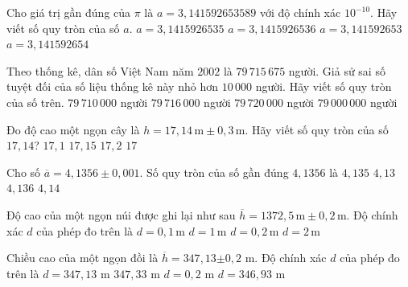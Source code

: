\begin{ex}%
	Cho giá trị gần đúng của $\pi $ là $ a=3,141592653589$ với độ chính xác $10^{-10}$. Hãy viết số quy tròn của số $a$.
	\choice
	{$ a=3{,}1415926535$}
	{$ a=3{,}1415926536$}
	{$ a=3{,}141592653$}
	{\True $ a=3{,}141592654$}
\end{ex}

\begin{ex}%
	Theo thống kê, dân số Việt Nam năm $ 2002$ là $ 79\, 715 \, 675$ người. Giả sử sai số tuyệt đối của số liệu thống kê này nhỏ hơn $ 10\, 000$ người. Hãy viết số quy tròn của số trên.
	\choice
	{$ 79\, 710\, 000$ người}
	{$ 79\, 716\, 000$ người}
	{\True $ 79\, 720\, 000$ người}
	{$ 79\, 000\, 000$ người}
\end{ex}

\begin{ex}%
	Đo độ cao một ngọn cây là $h=17{,}14\,\text{m}\pm 0{,}3\,\text{m}$. Hãy viết số quy tròn của số $17{,}14$?
	\choice
	{$17{,}1$}
	{$17{,}15$}
	{$17{,}2$}
	{\True $17$}
\end{ex}

\begin{ex}%
	Cho số $\overline{a}=4{,}1356\pm 0{,}001$. Số quy tròn của số gần đúng $ 4{,}1356$ là
	\choice
	{$ 4{,}135$}
	{$ 4{,}13$}
	{$ 4{,}136$}
	{\True $ 4{,}14$}
\end{ex}

\begin{ex}%
	Độ cao của một ngọn núi được ghi lại như sau $\overline{h}=1372{,}5\,\text{m}\pm 0{,}2\,\text{m}$. Độ chính xác $ d$ của phép đo trên là
	\choice
	{$ d=0{,}1\,\text{m}$}
	{$ d=1\,\text{m}$}
	{\True $ d=0{,}2\,\text{m}$}
	{$ d=2\,\text{m}$}
\end{ex}
\begin{ex}%
	Chiều cao của một ngọn đồi là $\overline{h}=347{,}13$$\pm 0,2$ m. Độ chính xác $ d$ của phép đo trên là
	\choice
	{$ d=347{,}13$ m}
	{$ 347{,}33$ m}
	{\True $ d=0{,}2$ m}
	{$ d=346{,}93$ m}
\end{ex}


